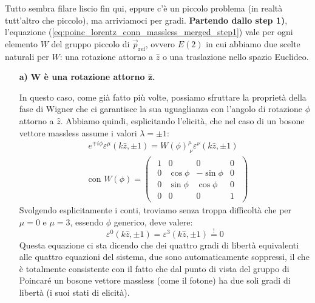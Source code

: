 \documentclass[../main.tex]{subfiles}
\begin{document}
Tutto sembra filare liscio fin qui, eppure c'è un piccolo problema (in realtà tutt'altro che piccolo), ma arriviamoci per gradi. \textbf{Partendo dallo step 1)}, l'equazione (\ref{eq:poinc_lorentz_conn_massless_merged_step1}) vale per ogni elemento $W$ del gruppo piccolo di $\Vec p_\text{ref}$, ovvero $E(2)$ in cui abbiamo due scelte naturali per $W$: una rotazione attorno a $\hat z$ o una traslazione nello spazio Euclideo.

\begin{enumerate}
    \item[\textbf{a)}] \textbf{$\mathbf{W}$ è una rotazione attorno $\hat{\mathbf{z}}$.}

    In questo caso, come già fatto più volte, possiamo sfruttare la proprietà della fase di Wigner che ci garantisce la sua uguaglianza con l'angolo di rotazione $\phi$ attorno a $\hat z$. Abbiamo quindi, esplicitando l'elicità, che nel caso di un bosone vettore massless assume i valori $\lambda=\pm 1$:
    \begin{align*}
        &e^{\mp i\phi}\varepsilon^\mu(k\hat z,\pm 1) = W(\phi)^\mu_{~\nu} \varepsilon^\nu(k\hat z,\pm 1) \\
        &\text{con } W(\phi) =
        \begin{pmatrix}
            \begin{array}{cccc}
                1 & 0 & 0 & 0 \\
                0 & \cos\phi & -\sin\phi & 0 \\
                0 & \sin\phi & \cos\phi & 0 \\
                0 & 0 & 0 & 1
            \end{array}
        \end{pmatrix}
    \end{align*}
    Svolgendo esplicitamente i conti, troviamo senza troppa difficoltà che per $\mu=0$ e $\mu=3$, essendo $\phi$ generico, deve valere:
    \[
    \boxed{\varepsilon^0(k\hat z,\pm 1) = \varepsilon^3(k\hat z,\pm 1)\overset{!}{=} 0}
    \]
    Questa equazione ci sta dicendo che dei quattro gradi di libertà equivalenti alle quattro equazioni del sistema, due sono automaticamente soppressi, il che è totalmente consistente con il fatto che dal punto di vista del gruppo di Poincaré un bosone vettore massless (come il fotone) ha due soli gradi di libertà (i suoi stati di elicità).


\end{enumerate}
\end{document}
